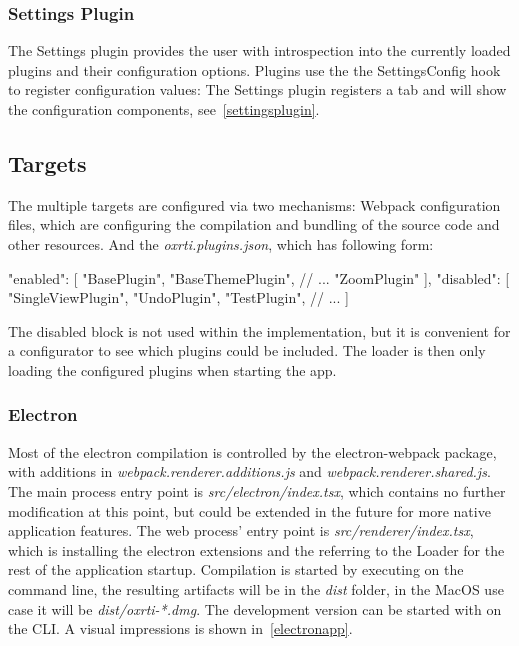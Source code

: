 \subsubsection{Settings Plugin}
The Settings plugin provides the user with introspection into the currently loaded
plugins and their configuration options. Plugins use the the SettingsConfig hook
to register configuration values:
The Settings plugin registers a tab and will show the configuration components,
see~\autoref{settingsplugin}.


\subsection{Targets}\label{sec_apps}
The multiple targets are configured via two mechanisms:
Webpack configuration files, which are configuring the compilation and bundling of the
source code and other resources. And the \emph{oxrti.plugins.json}, which has following form:
\begin{typescript}
{
    "enabled": [
        "BasePlugin",
        "BaseThemePlugin",
        // ...
        "ZoomPlugin"
    ],
    "disabled": [
        "SingleViewPlugin",
        "UndoPlugin",
        "TestPlugin",
        // ...
    ]
}
\end{typescript}
The disabled block is not used within the implementation, but it is convenient
for a configurator to see which plugins could be included. The loader is then
only loading the configured plugins when starting the app.

\subsubsection{Electron}
Most of the electron compilation is controlled by the electron-webpack package,
with additions in \emph{webpack.renderer.additions.js} and
\emph{webpack.renderer.shared.js}. The main process entry point is
\emph{src/electron/index.tsx}, which contains no further modification at this
point, but could be extended in the future for more native application features.
The web process' entry point is \emph{src/renderer/index.tsx}, which is
installing the electron extensions and the referring to the Loader for the rest
of the application startup. Compilation is started by executing  on the command line, the resulting artifacts will be
in the \emph{dist} folder, in the MacOS use case it will be
\emph{dist/oxrti-*.dmg}. The development version can be started with  on the CLI\@. A visual impressions is shown in~\autoref{electronapp}.


